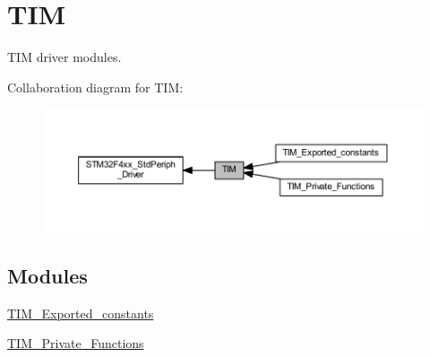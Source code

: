 \hypertarget{group___t_i_m}{}\section{T\+IM}
\label{group___t_i_m}


T\+IM driver modules.  


Collaboration diagram for T\+IM\+:
\nopagebreak
\begin{figure}[H]
\begin{center}
\leavevmode
\includegraphics[width=350pt]{group___t_i_m}
\end{center}
\end{figure}
\subsection*{Modules}
\begin{DoxyCompactItemize}
\item 
\hyperlink{group___t_i_m___exported__constants}{T\+I\+M\+\_\+\+Exported\+\_\+constants}
\item 
\hyperlink{group___t_i_m___private___functions}{T\+I\+M\+\_\+\+Private\+\_\+\+Functions}
\end{DoxyCompactItemize}
